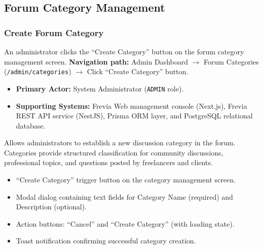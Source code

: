 \subsection{Forum Category Management}

\subsubsection{ Create Forum Category}

An administrator clicks the ``Create Category'' button on the forum category management screen.\newline
\textbf{Navigation path:} Admin Dashboard $\rightarrow$ Forum Categories (\texttt{/admin/categories}) $\rightarrow$ Click ``Create Category'' button.


\begin{itemize}[leftmargin=1.6em,topsep=3pt,itemsep=2pt,parsep=0pt,label=$\bullet$]
    \item \textbf{Primary Actor:} System Administrator (\texttt{ADMIN} role).
    \item \textbf{Supporting Systems:} Frevia Web management console (Next.js), Frevia REST API service (NestJS), Prisma ORM layer, and PostgreSQL relational database.
\end{itemize}

\noindent Allows administrators to establish a new discussion category in the forum. Categories provide structured classification for community discussions, professional topics, and questions posted by freelancers and clients.

\begin{itemize}[leftmargin=1.6em,topsep=3pt,itemsep=2pt,parsep=0pt,label=$\bullet$]
    \item ``Create Category'' trigger button on the category management screen.
    \item Modal dialog containing text fields for Category Name (required) and Description (optional).
    \item Action buttons: ``Cancel'' and ``Create Category'' (with loading state).
    \item Toast notification confirming successful category creation.
\end{itemize}


